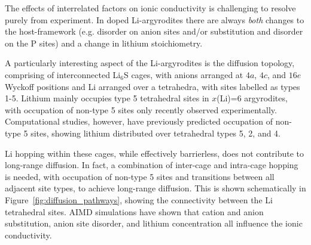 \documentclass[../main.tex]{subfiles}
\begin{document}
The effects of interrelated factors on ionic conductivity is challenging to resolve purely from experiment. In doped Li-argyrodites there are always \textit{both} changes to the host-framework (e.g. disorder on anion sites and/or substitution and disorder on the P sites) and a change in lithium stoichiometry. 

A particularly interesting aspect of the Li-argyrodites is the diffusion topology, comprising of interconnected Li$_6$S cages, with anions arranged at $4a$, $4c$, and $16e$ Wyckoff positions and Li arranged over a tetrahedra, with sites labelled as types 1-5.\cite{kuhs1979} Lithium mainly occupies type 5 tetrahedral sites in $x$(Li)=6 argyrodites, with occupation of non-type 5 sites only recently observed experimentally.\cite{ohno2019further,gautamengineering} Computational studies, however, have previously predicted occupation of non-type 5 sites, showing lithium distributed over tetrahedral types 5, 2, and 4.\cite{deiseroth_li6ps5x_2008, Minafra2020, morgan2020mechanistic}

Li hopping within these cages, while effectively barrierless, does not contribute to long-range diffusion. In fact, a combination of inter-cage and intra-cage hopping is needed, with occupation of non-type 5 sites and transitions between all adjacent site types, to achieve long-range diffusion. This is shown schematically in Figure~\ref{fig:diffusion_pathways}, showing the connectivity between the Li tetrahedral sites. AIMD simulations have shown that cation and anion substitution,\cite{ohno2019further,deklerk2016} anion site disorder,\cite{gautamengineering,morgan2020mechanistic} and lithium concentration\cite{Deng2017, yu_superionic_2020, Feng_2020} all influence the ionic conductivity.
\end{document}

